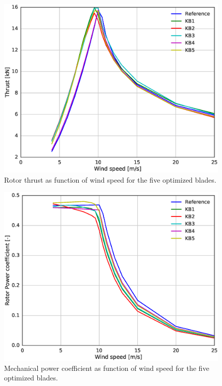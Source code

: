 \begin{figure}[pht]
\begin{center}
	\includegraphics[width=.85\linewidth]{figures/KBcomp_thrust.eps}
\end{center}
\caption{Rotor thrust as function of wind speed for the five optimized blades.}
\label{fig:thrust}
\end{figure}

\begin{figure}[pht]
\begin{center}
	\includegraphics[width=.85\linewidth]{figures/KBcomp_Cp.eps}
\end{center}
\caption{Mechanical power coefficient as function of wind speed for the five optimized blades.}
\label{fig:cp}
\end{figure}

